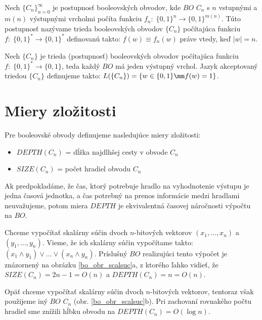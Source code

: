 \begin{definicia}
Nech $\{C_n\}_{n=0}^{\infty}$ je postupnosť booleovských obvodov,
kde $BO$ $C_n$ s $n$ vstupnými a $m(n)$ výstupnými vrcholmi počíta
funkciu $f_n:\; \{ 0,1\}^n\rightarrow\{ 0,1 \}^{m(n)}$. Túto
postupnosť nazývame trieda booleovských obvodov $\{ C_n\}$
počítajúca funkciu $f:\; \{ 0,1\}^*\rightarrow\{ 0,1\}^*$
definovanú takto: $f(w)\equiv f_n(w)$ práve vtedy, keď $|w|=n$.
\end{definicia}

\begin{definicia}
Nech $\{ C_n\}$ je trieda (postupnosť) booleovských obvodov
počítajúca funkciu \\ $f:\; \{ 0,1\}^*\rightarrow\{ 0,1\}$, teda
každý $BO$ má jeden výstupný vrchol. Jazyk akceptovaný triedou $\{
C_n\}$ definujeme takto: $L(\{ C_n\})=\{ w\in\{ 0,1\}\mm
f(w)=1\}$.
\end{definicia}

\section{Miery zložitosti}

Pre booleovské obvody definujeme nasledujúce miery zložitosti:
\begin{itemize}
  \item $DEPTH(C_n)$ = dĺžka najdlhšej cesty v obvode $C_n$
  \item $SIZE(C_n)$ = počet hradiel obvodu $C_n$
\end{itemize}

Ak predpokladáme, že čas, ktorý potrebuje hradlo na vyhodnotenie
výstupu je jedna časová jednotka, a čas potrebný na prenos
informácie medzi hradlami neuvažujeme, potom miera $DEPTH$ je
ekvivalentná časovej náročnosti výpočtu na $BO$.

\begin{priklad}
Chceme vypočítať skalárny súčin dvoch $n$-bitových vektorov
$(x_1,\dots ,x_n)$ a \linebreak $(y_1,\dots ,y_n)$. Vieme, že ich
skalárny súčin vypočítame takto: $(x_1\wedge y_1)\vee\dots\vee
(x_n\wedge y_n)$. \linebreak Príslušný $BO$ realizujúci tento
výpočet je znázornený na obrázku \ref{bo_obr_scalsuc}a, z ktorého ľahko \linebreak
vidieť, že $SIZE(C_n)=2n-1=O(n)$ a $DEPTH(C_n)=n=O(n)$.
\end{priklad}

\begin{priklad}
\label{bo_prikl_2}

Opäť chceme vypočítať skalárny súčin dvoch $n$-bitových vektorov,
tentoraz však použijeme iný $BO$ $C_n$ (obr. \ref{bo_obr_scalsuc}b). Pri
zachovaní rovnakého počtu hradiel sme znížili hĺbku obvodu na
$DEPTH(C_n)=O(\log n)$.
\end{priklad}

